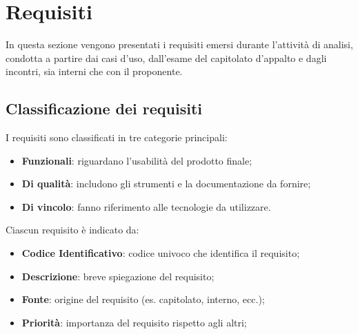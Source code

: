 \section{Requisiti}
In questa sezione vengono presentati i requisiti emersi durante l'attività di analisi, 
condotta a partire dai casi d'uso, dall'esame del capitolato d'appalto e dagli incontri, 
sia interni che con il proponente. 

\subsection{Classificazione dei requisiti}
I requisiti sono classificati in tre categorie principali:  
\begin{itemize}
	\item \textbf{Funzionali}: riguardano l'usabilità del prodotto finale;  
	\item \textbf{Di qualità}: includono gli strumenti e la documentazione da fornire;  
	\item \textbf{Di vincolo}: fanno riferimento alle tecnologie da utilizzare.
\end{itemize}
Ciascun requisito è indicato da:
\begin{itemize}
	\item \textbf{Codice Identificativo}: codice univoco che identifica il requisito;
	\item \textbf{Descrizione}: breve spiegazione del requisito;
	\item \textbf{Fonte}: origine del requisito (es. capitolato, interno, ecc.);
	\item \textbf{Priorità}: importanza del requisito rispetto agli altri;
\end{itemize} 

